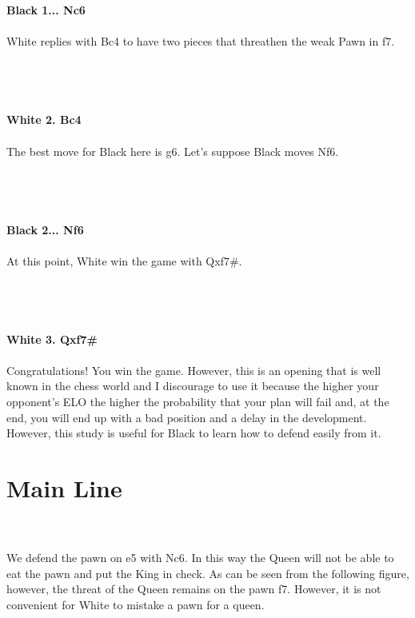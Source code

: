 \documentclass{article}
\begin{document}
\\
\\
\textbf{Black 1... Nc6}\\
\\
White replies with Bc4 to have two pieces that threathen the weak Pawn in f7.\\\\
\\

\\
\\
\textbf{White 2. Bc4}\\
\\
The best move for Black here is g6. Let's suppose Black moves Nf6.\\\\
\\

\\
\\
\textbf{Black 2... Nf6}\\
\\
At this point, White win the game with Qxf7\#.\\\\
\\

\\
\\
\textbf{White 3. Qxf7\#}\\
\\
Congratulations! You win the game. However, this is an opening that is well known in the chess world and I discourage to use it because the higher your opponent's ELO the higher the probability that your plan will fail and, at the end, you will end up with a bad position and a delay in the development. However, this study is useful for Black to learn how to defend easily from it.\section{ Main Line}

\\
\\
We defend the pawn on e5 with Nc6. In this way the Queen will not be able to eat the pawn and put the King in check. As can be seen from the following figure, however, the threat of the Queen remains on the pawn f7. However, it is not convenient for White to mistake a pawn for a queen.\\\\
\end{document}
